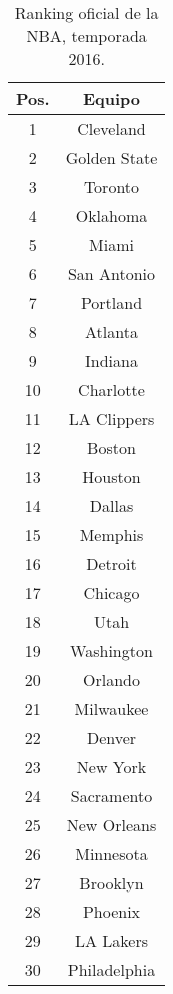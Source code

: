 \documentclass[a4paper]{article}
\begin{document}
\begin{wraptable}{c}{0.2\textwidth}
    \begin{subtable}{0.3\textwidth}
        \begin{tabular}{|c|c|}
            \hline
        	Pos. & Equipo\\
        	\hline
            1 & Cleveland \\
            2 & Golden State\\
            3 & Toronto \\
            4 & Oklahoma  \\
            5 & Miami \\
            6 & San Antonio \\
            7 & Portland  \\
            8 & Atlanta \\
            9 & Indiana \\
            10 & Charlotte \\
            11 & LA Clippers \\
            12 & Boston  \\
            13 & Houston  \\
            14 & Dallas  \\
            15 & Memphis  \\
            16 & Detroit \\
            17 & Chicago  \\
            18 & Utah  \\
            19 & Washington  \\
            20 & Orlando \\
            21 & Milwaukee  \\
            22 & Denver  \\
            23 & New York  \\
            24 & Sacramento  \\
            25 & New Orleans \\
            26 & Minnesota  \\
            27 & Brooklyn \\
            28 & Phoenix  \\
            29 & LA Lakers  \\
            30 & Philadelphia  \\
            \hline
        \end{tabular}
    \end{subtable}%
    \caption{Ranking oficial de la NBA, temporada 2016.}
    \label{tab:NBA_base}
\end{wraptable}
\end{document}
